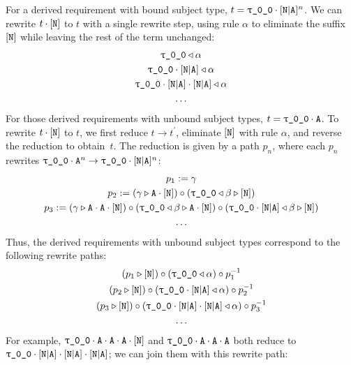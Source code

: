 \documentclass[../generics]{subfiles}
\begin{document}
\begin{example}
For a derived requirement with bound subject type, $t=\rT\cdot\aNA^n$. We can rewrite $t\cdot[\texttt{N}]$ to $t$ with a single rewrite step, using rule $\alpha$ to eliminate the suffix $[\texttt{N}]$ while leaving the rest of the term unchanged:
\begin{gather*}
\rT\WL\alpha\\
\rT\cdot\aNA\WL\alpha\\
\rT\cdot\aNA\cdot\aNA\WL\alpha\\
\ldots
\end{gather*}
For those derived requirements with unbound subject types, $t=\rT\cdot\nA$. To rewrite $t\cdot[\texttt{N}]$ to $t$, we first reduce $t\rightarrow t^\prime$, eliminate $[\texttt{N}]$ with rule $\alpha$, and reverse the reduction to obtain~$t$. The reduction is given by a path $p_n$, where each $p_n$ rewrites $\rT\cdot\nA^n\rightarrow\rT\cdot\aNA^n$:
\begin{gather*}
p_1:=\gamma\\
p_2:=(\gamma\WR\nA\cdot\protosym{N})\circ(\rT\WL\beta\WR\protosym{N})\\
p_3:=(\gamma\WR\nA\cdot\nA\cdot\protosym{N})\circ(\rT\WL\beta\WR\nA\cdot\protosym{N})\circ(\rT\cdot\aNA\WL\beta\WR\protosym{N})\\
\ldots
\end{gather*}
Thus, the derived requirements with unbound subject types correspond to the following rewrite paths:
\begin{gather*}
(p_1\WR\protosym{N})\circ(\rT\WL\alpha)\circ p_1^{-1}\\
(p_2\WR\protosym{N})\circ(\rT\cdot\aNA\WL\alpha)\circ p_2^{-1}\\
(p_3\WR\protosym{N})\circ(\rT\cdot\aNA\cdot\aNA\WL\alpha)\circ p_3^{-1}\\
\ldots
\end{gather*}
For example, $\rT\cdot\nA\cdot\nA\cdot\nA\cdot\protosym{N}$ and $\rT\cdot\nA\cdot\nA\cdot\nA$ both reduce to $\rT\cdot\aNA\cdot\aNA\cdot\aNA$; we can join them with this rewrite path:
\begin{center}
\end{center}


\end{example}
\end{document}
